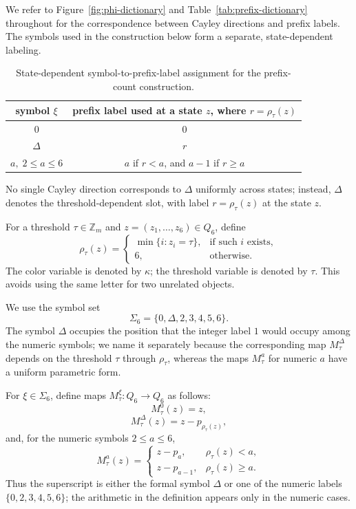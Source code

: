 \documentclass[11pt]{article}
\theoremstyle{definition}
\begin{document}
We refer to Figure~\ref{fig:phi-dictionary} and Table~\ref{tab:prefix-dictionary} throughout for the correspondence between Cayley directions and prefix labels.  The symbols used in the construction below form a separate, state-dependent labeling.

\begin{table}[t]
\centering
\small
\begin{tabular}{cc}
\toprule
symbol \(\xi\) & prefix label used at a state \(z\), where \(r=\rho_\tau(z)\)\\
\midrule
\(0\) & \(0\)\\
\(\Delta\) & \(r\)\\
\(a,\;2\le a\le6\) & \(a\) if \(r<a\), and \(a-1\) if \(r\ge a\)\\
\bottomrule
\end{tabular}
\caption{State-dependent symbol-to-prefix-label assignment for the prefix-count construction.}
\label{tab:symbol-label}
\end{table}

No single Cayley direction corresponds to \(\Delta\) uniformly across states; instead, \(\Delta\) denotes the threshold-dependent slot, with label \(r=\rho_\tau(z)\) at the state \(z\).

For a threshold \(\tau\in\mathbb Z_m\) and \(z=(z_1,\ldots,z_6)\in Q_6\), define
\[
\rho_\tau(z)=
\begin{cases}
\min\{i:z_i=\tau\},&\text{if such }i\text{ exists},\\
6,&\text{otherwise}.
\end{cases}
\]
The color variable is denoted by \(\kappa\); the threshold variable is denoted by \(\tau\).  This avoids
using the same letter for two unrelated objects.

We use the symbol set
\[
\Sigma_6=\{0,\Delta,2,3,4,5,6\}.
\]
The symbol \(\Delta\) occupies the position that the integer label \(1\) would occupy among the numeric symbols; we name it separately because the corresponding map \(M_\tau^\Delta\) depends on the threshold \(\tau\) through \(\rho_\tau\), whereas the maps \(M_\tau^a\) for numeric \(a\) have a uniform parametric form.

For \(\xi\in\Sigma_6\), define maps \(M_\tau^\xi:Q_6\to Q_6\) as follows:
\[
M_\tau^0(z)=z,
\]
\[
M_\tau^\Delta(z)=z-p_{\rho_\tau(z)},
\]
and, for the numeric symbols \(2\le a\le6\),
\[
M_\tau^a(z)=
\begin{cases}
z-p_a,&\rho_\tau(z)<a,\\
z-p_{a-1},&\rho_\tau(z)\ge a.
\end{cases}
\]
Thus the superscript is either the formal symbol \(\Delta\) or one of the numeric labels \(\{0,2,3,4,5,6\}\); the
arithmetic in the definition appears only in the numeric cases.
\end{document}

